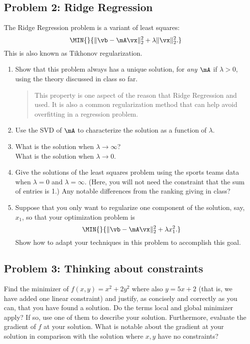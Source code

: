 \documentclass[]{article}
\begin{document}
\hypertarget{problem-2-ridge-regression}{%
\subsection{Problem 2: Ridge
Regression}\label{problem-2-ridge-regression}}

The Ridge Regression problem is a variant of least squares:
\[ \MIN{}{\| \vb - \mA \vx\|_2^2 + \lambda \| \vx\|_2^2. } \] This is
also known as Tikhonov regularization.

\begin{enumerate}
\def\labelenumi{\arabic{enumi}.}
\item
  Show that this problem always has a unique solution, for \emph{any
  \(\mA\)} if \(\lambda > 0\), using the theory discussed in class so
  far.

  \begin{quote}
  This property is one aspect of the reason that Ridge Regression and
  used. It is also a common regularization method that can help avoid
  overfitting in a regression problem.
  \end{quote}
\item
  Use the SVD of \(\mA\) to characterize the solution as a function of
  \(\lambda\).
\item
  What is the solution when \(\lambda \to \infty\)?\\
  What is the solution when \(\lambda \to 0\).
\item
  Give the solutions of the least squares problem using the sports teams
  data when \(\lambda = 0\) and \(\lambda = \infty\). (Here, you will
  not need the constraint that the sum of entries is 1.) Any notable
  differences from the ranking giving in class?
\item
  Suppose that you only want to regularize one component of the
  solution, say, \(x_1\), so that your optimization problem is
  \[ \MIN{}{\| \vb - \mA \vx\|_2^2 + \lambda x_1^2. } \] Show how to
  adapt your techniques in this problem to accomplish this goal.
\end{enumerate}

\hypertarget{problem-3-thinking-about-constraints}{%
\subsection{Problem 3: Thinking about
constraints}\label{problem-3-thinking-about-constraints}}

Find the minimizer of \(f(x,y) = x^2 + 2y^2\) where also \(y = 5x + 2\)
(that is, we have added one linear constraint) and justify, as concisely
and correctly as you can, that you have found a solution. Do the terms
local and global minimizer apply? If so, use one of them to describe
your solution. Furthermore, evaluate the gradient of \(f\) at your
solution. What is notable about the gradient at your solution in
comparison with the solution where \(x,y\) have no constraints?
\end{document}

